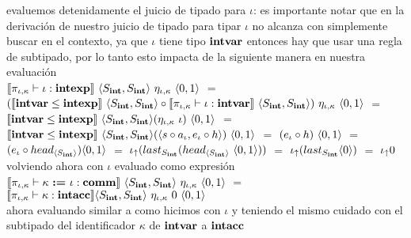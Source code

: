 \noindent
evaluemos detenidamente el juicio de tipado para $\iota$: es importante notar que en
la derivaci\'on de nuestro juicio de tipado  para tipar $\iota$ no alcanza con
simplemente buscar en el contexto, ya que $\iota$ tiene tipo $\textbf{intvar}$ entonces
hay que usar una regla de subtipado, por lo tanto esto impacta de la siguiente
manera en nuestra evaluaci\'on\\

$\llbracket  \pi_{\iota,\kappa} \vdash \iota : \textbf{intexp}  \rrbracket 
	\ \langle S_{\textbf{int}},S_{\textbf{int}} \rangle
	\ \eta_{\iota,\kappa} 
	\ \langle 0,1 \rangle$ $=$ \\
	\indent
	$(\semBrcks{\intvar \leq \intexp} \ \lrangles{S_\intt,S_\intt}
	\circ 
	\semBrcks{ \pi_{\iota,\kappa} \vdash \iota : \intvar } \ \lrangles{S_\intt,S_\intt})
		\ \eta_{\iota,\kappa} 
		\ \lrangles{0,1}$ $=$\\
	\indent
	$\semBrcks{\intvar \leq \intexp} \ \lrangles{S_\intt,S_\intt} 
				(\eta_{\iota,\kappa} \ \iota) \ \lrangles{0,1}$ $=$\\
	\indent
	$\semBrcks{\intvar \leq \intexp} \ \lrangles{S_\intt,S_\intt} 
				(\lrangles{s \circ a_\iota,e_\iota \circ h}) \ \lrangles{0,1}$ $=$
	$(e_\iota \circ h) \ \langle 0,1 \rangle$ $=$\\
	\indent
	$(e_\iota \circ head_{\langle S_{\textbf{int}} \rangle}) \langle 0,1 \rangle$ $=$
	$\iota_{\uparrow} (last_{S_{\textbf{int}}} (head_{\langle S_{\textbf{int}} \rangle} \ \langle 0,1 \rangle))$ $=$
	$\iota_{\uparrow} (last_{S_{\textbf{int}}} \langle 0 \rangle)$ $=$ $\iota_{\uparrow} 0$\\
	
\noindent
volviendo ahora con $\iota$ evaluado como expresi\'on\\

$\llbracket \pi_{\iota,\kappa} \vdash \kappa \ \textbf{:=} \ \iota: \textbf{comm} \rrbracket
		\ \langle S_{\textbf{int}},S_{\textbf{int}} \rangle \ \eta_{\iota,\kappa}
		\ \langle 0,1 \rangle$ $=$\\
\indent \indent \indent \indent
$\llbracket \pi_{\iota,\kappa} \vdash \kappa : \textbf{intacc} \rrbracket
	\langle S_{\textbf{int}},S_{\textbf{int}} \rangle 
	\ \eta_{\iota,\kappa}
	\ 0 \ \langle 0,1 \rangle$\\

\noindent
ahora evaluando similar a como hicimos con $\iota$ y teniendo el mismo cuidado
con el subtipado del identificador $\kappa$ de $\textbf{intvar}$ a $\textbf{intacc}$\\

